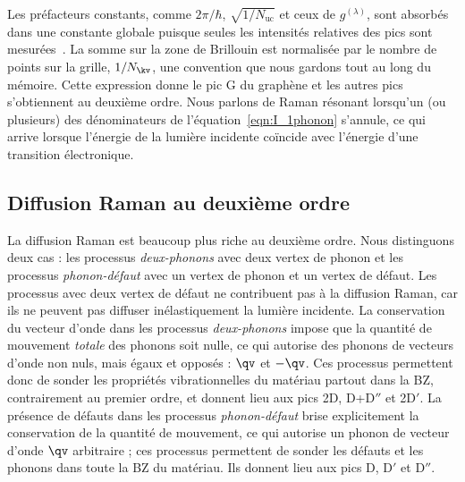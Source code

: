 Les préfacteurs constants, comme $2\pi/\hbar$, $\sqrt{1/N_\text{uc}}$ et ceux de $g^{(\lambda)}$, sont absorbés dans une constante globale puisque seules les intensités relatives des pics sont mesurées~\cite{venezuelaTheoryDoubleresonantRaman2011}. La somme sur la zone de Brillouin est normalisée par le nombre de points sur la grille, $1/N_\kv$, une convention que nous gardons tout au long du mémoire. Cette expression donne le pic G du graphène et les autres pics s'obtiennent au deuxième ordre. Nous parlons de Raman résonant lorsqu'un (ou plusieurs) des dénominateurs de l'équation~\eqref{eqn:I_1phonon} s'annule, ce qui arrive lorsque l'énergie de la lumière incidente coïncide avec l'énergie d'une transition électronique. 

\subsection{Diffusion Raman au deuxième ordre}

La diffusion Raman est beaucoup plus riche au deuxième ordre.
Nous distinguons deux cas : les processus \textit{deux-phonons} avec deux vertex de phonon et les processus \textit{phonon-défaut} avec un vertex de phonon et un vertex de défaut. Les processus avec deux vertex de défaut ne contribuent pas à la diffusion Raman, car ils ne peuvent pas diffuser inélastiquement la lumière incidente. La conservation du vecteur d'onde dans les processus \textit{deux-phonons} impose que la quantité de mouvement \textit{totale} des phonons soit nulle, ce qui autorise des phonons de vecteurs d'onde non nuls, mais égaux et opposés : $\qv$ et $-\qv$. Ces processus permettent donc de sonder les propriétés vibrationnelles du matériau partout dans la BZ, contrairement au premier ordre, et donnent lieu aux pics 2D, D+D$''$ et 2D$'$. La présence de défauts dans les processus \textit{phonon-défaut} brise explicitement la conservation de la quantité de mouvement, ce qui autorise un phonon de vecteur d'onde $\qv$ arbitraire ; ces processus permettent de sonder les défauts et les phonons dans toute la BZ du matériau. Ils donnent lieu aux pics D, D$'$ et D$''$.

